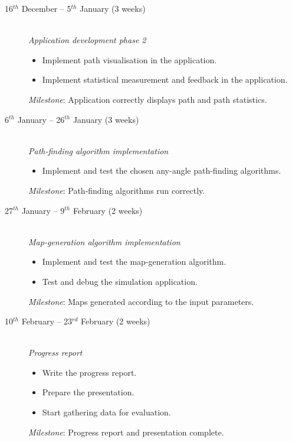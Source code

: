 \begin{description}
\item[16$^{th}$ December -- 5$^{th}$ January (3 weeks)] \hfill \\

{\em Application development phase 2}
\begin{itemize}
\item Implement path visualisation in the application.
\item Implement statistical measurement and feedback in the application.
\end{itemize}
{\em Milestone}: Application correctly displays path and path statistics.\\

\item[6$^{th}$ January -- 26$^{th}$ January (3 weeks)] \hfill \\

{\em Path-finding algorithm implementation}
\begin{itemize}
\item Implement and test the chosen any-angle path-finding algorithms.
\end{itemize}
{\em Milestone}: Path-finding algorithms run correctly.\\

\item[27$^{th}$ January -- 9$^{th}$ February (2 weeks)] \hfill \\

{\em Map-generation algorithm implementation}
\begin{itemize}
\item Implement and test the map-generation algorithm.  
\item Test and debug the simulation application.
\end{itemize}
{\em Milestone}: Maps generated according to the input parameters.\\

\item[10$^{th}$ February -- 23$^{rd}$ February (2 weeks)] \hfill \\

{\em Progress report}
\begin{itemize}
\item Write the progress report.  
\item Prepare the presentation.
\item Start gathering data for evaluation.
\end{itemize}
{\em Milestone}: Progress report and presentation complete.\\


\end{description}
